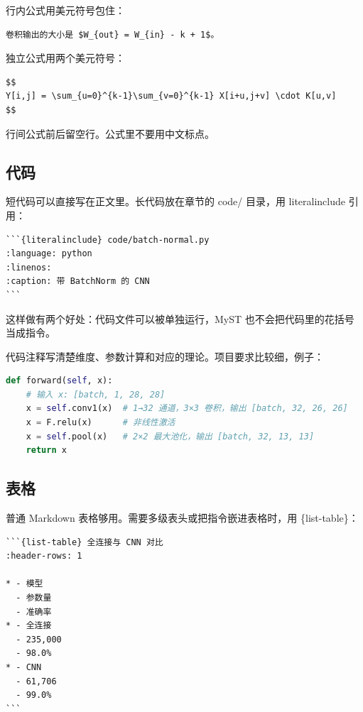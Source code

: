\documentclass[UTF8,fontset=none,a4paper,11pt]{ctexart}
\newcommand{\code}[1]{{\CJKsetecglue{}\ttfamily #1}}
\begin{document}
行内公式用美元符号包住：

\begin{lstlisting}
卷积输出的大小是 $W_{out} = W_{in} - k + 1$。
\end{lstlisting}

独立公式用两个美元符号：

\begin{lstlisting}
$$
Y[i,j] = \sum_{u=0}^{k-1}\sum_{v=0}^{k-1} X[i+u,j+v] \cdot K[u,v]
$$
\end{lstlisting}

行间公式前后留空行。公式里不要用中文标点。

\subsection{代码}\label{sec:code-syntax}

短代码可以直接写在正文里。长代码放在章节的 \code{code/} 目录，用 \code{literalinclude} 引用：

\begin{lstlisting}
```{literalinclude} code/batch-normal.py
:language: python
:linenos:
:caption: 带 BatchNorm 的 CNN
```
\end{lstlisting}

这样做有两个好处：代码文件可以被单独运行，MyST 也不会把代码里的花括号当成指令。

代码注释写清楚维度、参数计算和对应的理论。项目要求比较细，例子：

\begin{lstlisting}[language=python]
def forward(self, x):
    # 输入 x: [batch, 1, 28, 28]
    x = self.conv1(x)  # 1→32 通道，3×3 卷积，输出 [batch, 32, 26, 26]
    x = F.relu(x)      # 非线性激活
    x = self.pool(x)   # 2×2 最大池化，输出 [batch, 32, 13, 13]
    return x
\end{lstlisting}

\subsection{表格}\label{sec:table-syntax}

普通 Markdown 表格够用。需要多级表头或把指令嵌进表格时，用 \code{\{list-table\}}：

\begin{lstlisting}
```{list-table} 全连接与 CNN 对比
:header-rows: 1

* - 模型
  - 参数量
  - 准确率
* - 全连接
  - 235,000
  - 98.0%
* - CNN
  - 61,706
  - 99.0%
```
\end{lstlisting}
\end{document}
